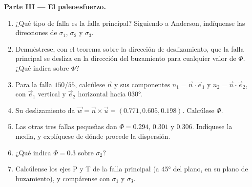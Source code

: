 \begin{problem}
\medskip\noindent\textbf{Parte III --- El paleoesfuerzo.}
\begin{enumerate}[resume]
  \item ¿Qué tipo de falla es la falla principal? Siguiendo a Anderson, indíquense las
        direcciones de $\sigma_1$, $\sigma_2$ y $\sigma_3$.
  \item Demuéstrese, con el teorema sobre la dirección de deslizamiento, que la falla principal
        se desliza en la dirección del buzamiento para cualquier valor de $\Phi$. ¿Qué
        indica sobre $\Phi$?
  \item Para la falla $150/55$, calcúlese $\vec n$ y sus componentes $n_1 =
        \vec n\cdot\vec e_1$ y $n_2 = \vec n\cdot\vec e_2$, con $\vec e_1$
        vertical y $\vec e_2$ horizontal hacia \ang{030}.
  \item Su deslizamiento da $\vec w = \vec n\times\vec u = (0.771, 0.605, 0.198)$.
        Calcúlese $\Phi$.
  \item Las otras tres fallas pequeñas dan $\Phi = 0.294$, $0.301$ y
        $0.306$. Indíquese la media, y explíquese de dónde procede la dispersión.
  \item ¿Qué indica $\Phi = 0.3$ sobre $\sigma_2$?
  \item Calcúlense los ejes P y T de la falla principal (a \ang{45} del
        plano, en su plano de buzamiento), y compárense con $\sigma_1$ y
        $\sigma_3$.
\end{enumerate}


\end{problem}
